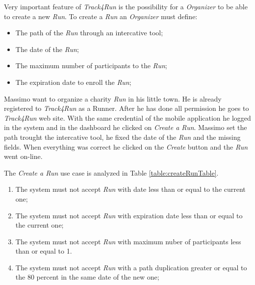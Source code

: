 Very important feature of \textit{Track4Run} is the possibility for a \textit{Organizer} to be able to create a new \textit{Run}.
To create a \textit{Run} an \textit{Organizer} must define:
\begin{itemize}
  \item The path of the \textit{Run} through an intercative tool;
  \item The date of the \textit{Run};
  \item The maximum number of participants to the \textit{Run};
  \item The expiration date to enroll the \textit{Run};
\end{itemize}

Massimo want to organize a charity \textit{Run} in his little town. He is already registered to \textit{Track4Run} as a Runner. After he has done all permission he goes to \textit{Track4Run} web site.
With the same credential of the mobile application he logged in the system and in the dashboard he clicked on \textit{Create a Run}. Massimo set the path trought the intercative tool, he fixed the date of the \textit{Run} and the missing fields. When everything was correct he clicked on the \textit{Create} button and the \textit{Run} went on-line.


The \textit{Create a Run} use case is analyzed in Table \ref{table:createRunTable}.

\begin{enumerate}
  \item The system must not accept \textit{Run} with date less than or equal to the current one;
  \item The system must not accept \textit{Run} with expiration date less than or equal to the current one;
  \item The system must not accept \textit{Run} with maximum nuber of participants less than or equal to 1.
  \item The system must not accept \textit{Run} with a path duplication greater or equal to the 80 percent in the same date of the new one;
\end{enumerate}

